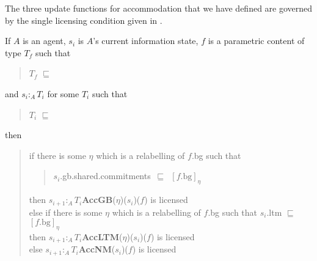 The three update functions for accommodation that we have defined are
governed by the single licensing condition given in \nexteg{}.
\begin{ex} 
If $A$ is an agent, $s_i$ is $A$'s current information state, $f$ is a
parametric content of type $T_f$ such that
\begin{quote}
$T_f$ $\sqsubseteq$ 
\end{quote}
 and
$s_i:_A T_i$ for some $T_i$ such that 
\begin{quote}
$T_i$ $\sqsubseteq$ 
\end{quote}
then \\
\begin{quote}
if there is some $\eta$ which is a relabelling of $f$.bg such that 
\begin{quote}
\mbox{$s_i$.gb.shared.commitments $\sqsubseteq$ $[f.\mathrm{bg}]_\eta$}
\end{quote}
then $s_{i+1} :_A
T_i$\fbox{\d{$\wedge$}}\textbf{AccGB}($\eta$)($s_i$)($f$) is
licensed\\[\baselineskip]
else if there is some $\eta$ which is a relabelling of
$f$.bg such that $s_i$.ltm
$\sqsubseteq$ $[f.\mathrm{bg}]_\eta$\\[.25\baselineskip]
then $s_{i+1} :_A
T_i$\fbox{\d{$\wedge$}}\textbf{AccLTM}($\eta$)($s_i$)($f$) is
licensed\\[\baselineskip] 
else $s_{i+1} :_A
T_i$\fbox{\d{$\wedge$}}\textbf{AccNM}($s_i$)($f$) is
licensed
\end{quote} 
\label{ex:propname-acc-lic}
\end{ex}


